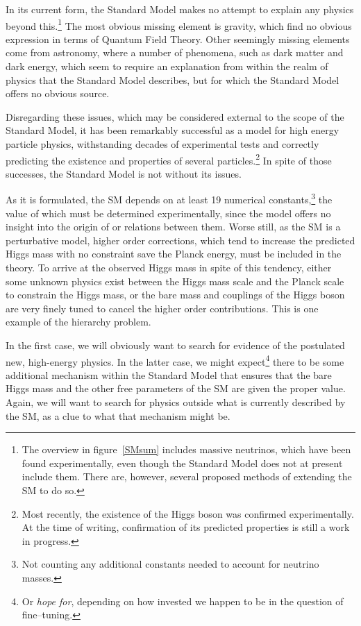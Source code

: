 In its current form, the Standard Model makes no attempt to explain any physics beyond this.\footnote{The overview in figure~\ref{SMsum} includes massive neutrinos, which have been found experimentally, even though the Standard Model does not at present include them. There are, however, several proposed methods of extending the SM to do so.} The most obvious missing element is gravity, which find no obvious expression in terms of Quantum Field Theory. Other seemingly missing elements come from astronomy, where a number of phenomena, such as dark matter and dark energy, which seem to require an explanation from within the realm of physics that the Standard Model describes, but for which the Standard Model offers no obvious source.

Disregarding these issues, which may be considered external to the scope of the Standard Model, it has been remarkably successful as a model for high energy particle physics, withstanding decades of experimental tests and correctly predicting the existence and properties of several particles.\footnote{Most recently, the existence of the Higgs boson was confirmed experimentally. At the time of writing, confirmation of its predicted properties is still a work in progress.} In spite of those successes, the Standard Model is not without its issues.

As it is formulated, the SM depends on at least 19 numerical constants,\footnote{Not counting any additional constants needed to account for neutrino masses.} the value of which must be determined experimentally, since the model offers no insight into the origin of or relations between them. Worse still, as the SM is a perturbative model, higher order corrections, which tend to increase the predicted Higgs mass with no constraint save the Planck energy, must be included in the theory. To arrive at the observed Higgs mass in spite of this tendency, either some unknown physics exist between the Higgs mass scale and the Planck scale to constrain the Higgs mass, or the bare mass and couplings of the Higgs boson are very finely tuned to cancel the higher order contributions. This is one example of the hierarchy problem.

In the first case, we will obviously want to search for evidence of the postulated new, high-energy physics. In the latter case, we might expect\footnote{Or \emph{hope for}, depending on how invested we happen to be in the question of fine--tuning.} there to be some additional mechanism within the Standard Model that ensures that the bare Higgs mass and the other free parameters of the SM are given the proper value. Again, we will want to search for physics outside what is currently described by the SM, as a clue to what that mechanism might be.

